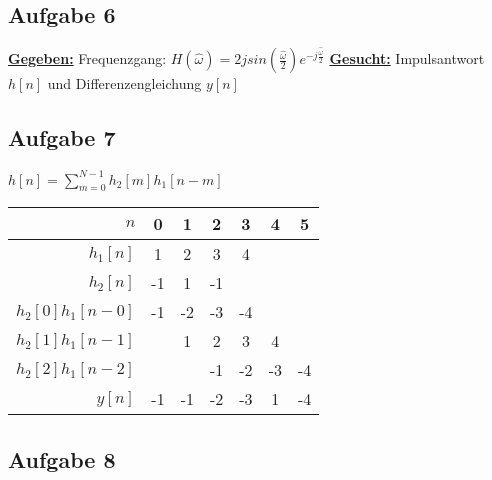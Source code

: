 \documentclass[12pt]{scrreprt}
\begin{document}
\subsection*{Aufgabe 6}
\underline{\textbf{Gegeben:}}\newline
\hspace*{5mm}Frequenzgang: $H(\hat{\omega})=2jsin(\frac{\hat{\omega}}{2})e^{-j\frac{\hat{\omega}}{2}}$\newline
\underline{\textbf{Gesucht:}}\newline
\hspace*{5mm}Impulsantwort $h[n]$ und Differenzengleichung $y[n]$\newline

\subsection*{Aufgabe 7}
\hspace*{5mm}$h[n]=\sum_{m=0}^{N-1}h_2[m]h_1[n-m]$\newline
\newline
\begin{tabular}{r|cccccc}
$n$ 				&  0  &  1  &  2  & 3   &  4  & 5 \\\hline
$h_1[n]$			&  1  &  2  &  3  & 4   &     &   \\
$h_2[n]$			& -1  &  1  & -1  &     &     &   \\\hline
$h_2[0]h_1[n-0]$	& -1  & -2  & -3  & -4  &     &   \\
$h_2[1]h_1[n-1]$	&     &  1  &  2  &  3  &  4  &   \\
$h_2[2]h_1[n-2]$	&     &     & -1  & -2  & -3  & -4\\\hline
$y[n]$              & -1  & -1  & -2  & -3  &  1  & -4\\
\end{tabular}

\subsection*{Aufgabe 8}
\end{document}
